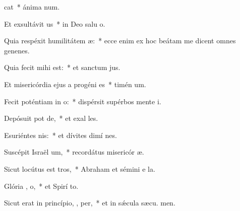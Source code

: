 \item {}cat~* ánima  num.
\item Et exsultávit  us~* in Deo salu o.
\item Quia respéxit humilitátem  æ:~* ecce enim ex hoc beátam me dicent omnes genenes.
\item Quia fecit mihi    est:~* et sanctum  jus.
\item Et misericórdia ejus a progéni  es~* timén um.
\item Fecit poténtiam in  o:~* dispérsit supérbos mente  i.
\item Depósuit pot  de,~* et exal les.
\item Esuriéntes  nis:~* et dívites dimí nes.
\item Suscépit Israël  um,~* recordátus misericór æ.
\item Sicut locútus est   tros,~* Abraham et sémini e  la.
\item Glória ,  o,~* et Spirí to.
\item Sicut erat in princípio,  ,  per,~* et in sǽcula sæcu. men.
